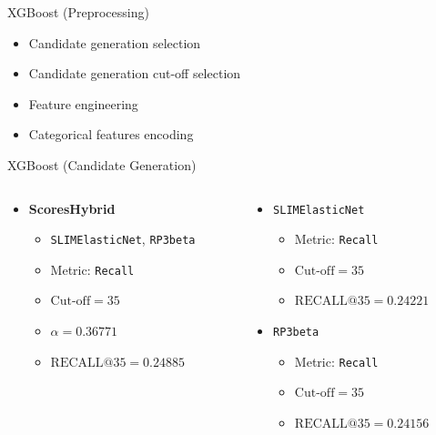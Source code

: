 \documentclass{beamer}
\begin{document}
\begin{frame}{XGBoost (Preprocessing)}
  \begin{itemize}
    \item Candidate generation selection
    \item Candidate generation cut-off selection
    \item Feature engineering
    \item Categorical features encoding
  \end{itemize}
\end{frame}


\begin{frame}{XGBoost (Candidate Generation)}
  \begin{columns}[t]
    \begin{column}{0.5\textwidth}
      \begin{itemize}
        \item \textbf{ScoresHybrid}
        \begin{itemize}
          \item \texttt{SLIMElasticNet}, \texttt{RP3beta}
          \item Metric: \texttt{Recall}
          \item $\text{Cut-off}=35$
          \item $\alpha=0.36771$
          \item $\text{RECALL@}35=0.24885$
        \end{itemize}
      \end{itemize}
    \end{column}

    \begin{column}{0.5\textwidth}
      \begin{itemize}
        \item \texttt{SLIMElasticNet}
        \begin{itemize}
          \item Metric: \texttt{Recall}
          \item $\text{Cut-off}=35$
          \item $\text{RECALL@}35=0.24221$
        \end{itemize}
        \item \texttt{RP3beta}
        \begin{itemize}
          \item Metric: \texttt{Recall}
          \item $\text{Cut-off}=35$
          \item $\text{RECALL@}35=0.24156$
        \end{itemize}
      \end{itemize}
    \end{column}
  \end{columns}
\end{frame}
\end{document}
